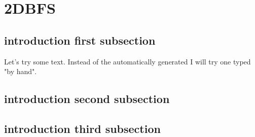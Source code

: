 \documentclass[crop=false]{standalone}
\begin{document}
\section{2DBFS}

\subsection{introduction first subsection}
Let's try some text. Instead of the automatically generated
I will try one typed "by hand".

\subsection{introduction second subsection}

\blindtext

\subsection{introduction third subsection}

\blindtext
\end{document}
